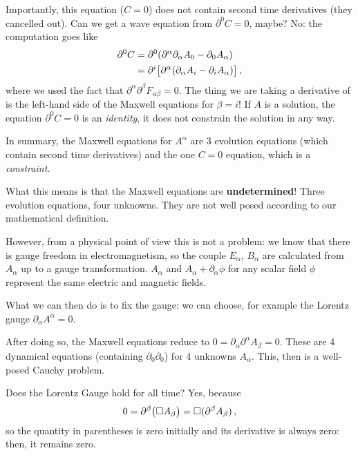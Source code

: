 \documentclass[main.tex]{subfiles}
\begin{document}
Importantly, this equation (\(C=0\)) does not contain second time derivatives (they cancelled out).
Can we get a wave equation from \(\partial^0 C = 0\), maybe? No: the computation goes like 
%
\begin{align}
\partial^{0} C &= \partial^{0} \qty(\partial^{\alpha } \partial_{\alpha } A_0 - \partial_{0} A_\alpha )  \\
&= \partial^{i} \qty[\partial^{\alpha } (\partial_{\alpha } A_i - \partial_{i} A_\alpha )]
\,,
\end{align}
%
where we used the fact that \(\partial^{\alpha } \partial^{\beta } F_{\alpha \beta } = 0\).
The thing we are taking a derivative of is the left-hand side of the Maxwell equations for \(\beta = i\)! 
If \(A\) is a solution, the equation \(\partial^{0} C= 0\) is an \emph{identity}, it does not constrain the solution in any way. 

In summary, the Maxwell equations for \(A^{\alpha }\) are 
3 evolution equations (which contain second time derivatives) 
and the one \(C = 0\) equation, which is a \emph{constraint.}

What this means is that the Maxwell equations are \textbf{undetermined}! 
Three evolution equations, four unknowns. 
They are not well posed according to our mathematical definition. 

However, from a physical point of view this is not a problem: 
we know that there is gauge freedom in electromagnetism,
so the couple \(E_\alpha \), \(B_\alpha \) are calculated from \(A_\alpha \) up to a gauge transformation. 
\(A_\alpha \) and \(A_\alpha + \partial_{\alpha } \phi \) for any scalar field \(\phi \) represent the same electric and magnetic fields.

What we can then do is to fix the gauge: 
we can choose, for example the Lorentz gauge \(\partial_{\alpha } A^{\alpha } = 0\). 

After doing so, the Maxwell equations reduce to \(0 = \partial_{\alpha } \partial^{\alpha } A_\beta =0 \). 
These are 4 dynamical equations (containing \(\partial_0 \partial_0 \)) for 4 unknowns \(A_\alpha \). 
This, then is a well-posed Cauchy problem. 

Does the Lorentz Gauge hold for all time?
Yes, because 
%
\begin{align}
0 = \partial^{\beta } \qty(\square A_\beta ) = \square (\partial^{\beta } A_\beta )
\,,
\end{align}
%
so the quantity in parentheses is zero initially and its derivative is always zero: then, it remains zero. 
\end{document}

